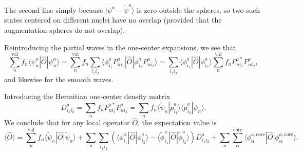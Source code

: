 \documentclass[a4paper]{article}
\newcommand{\s}[1]{\tilde{#1}}
\newcommand{\wh}[1]{\widehat{#1}}
\newcommand{\bra}[1]{\langle #1 |}
\newcommand{\ket}[1]{| #1 \rangle}
\newcommand{\braket}[2]{\langle #1 | #2 \rangle}
\begin{document}
The second line simply because $\ket{\psi^a - \s{\psi}^a}$ is zero
outside the spheres, so two such states centered on different nuclei
have no overlap (provided that the augmentation spheres do not
overlap).
\par Reintroducing the partial waves in the one-center expansions, we see that
%
\begin{equation}
\sum_n^\text{val} f_n \bra{\psi_{n}^{a}}\wh{O}\ket{\psi_{n}^{a}} = \sum_n^\text{val} f_n \sum_{i_1i_2} \bra{\phi_{i_1}^{a}P^a_{ni_1}} \wh{O} \ket{\phi_{i_2}^{a} P_{ni_2}^{a}} = \sum_{i_1i_2}\bra{\phi_{i_1}^{a}}\wh{O}\ket{\phi_{i_2}^a} \sum_n^\text{val} f_n P_{ni_1}^{a*}P_{ni_2}^a,
\end{equation}
%
and likewise for the smooth waves.%
\par Introducing the Hermitian one-center density matrix
%
\begin{equation}\label{eq: density matrix}
D_{i_1i_2}^a =\sum_n f_n P_{ni_1}^{a*} P_{ni_2}^{a} = \sum_n f_n
\braket{\s{\psi}_n}{\s{p}_{i_1}^a}
\braket{\s{p}_{i_2}^a}{\s{\psi}_n}.
\end{equation}
%
We conclude that for any local operator $\wh{O}$, the expectation value is
%
\begin{equation}\label{eq: local exp values}
  \langle \wh{O} \rangle = \sum_n^\text{val} f_n \bra{\s{\psi}_n}\wh{O}\ket{\s{\psi}_n} + \sum_a \sum_{i_1i_2} \left( \bra{\phi_{i_1}^{a}}\wh{O}\ket{\phi_{i_2}^a} - \bra{\s{\phi}_{i_1}^{a}}\wh{O}\ket{\s{\phi}_{i_2}^a} \right)D_{i_1i_2}^a + \sum_a \sum_\alpha^\text{core} \bra{\phi_\alpha^{a,\text{core}}}\wh{O}\ket{\phi_\alpha^{a,\text{core}}}.
\end{equation}
%
\end{document}
